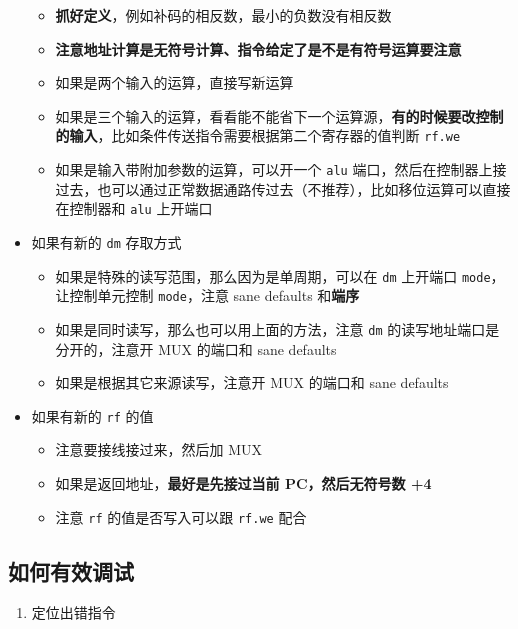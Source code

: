\documentclass[12pt,AutoFakeBold]{article}
\providecommand{\tightlist}{%
  \setlength{\itemsep}{0pt}\setlength{\parskip}{0pt}}
\begin{document}
\begin{itemize}
  \begin{itemize}
  \tightlist
  \item
    \textbf{抓好定义}，例如补码的相反数，最小的负数没有相反数
  \item
    \textbf{注意地址计算是无符号计算、指令给定了是不是有符号运算要注意}
  \item
    如果是两个输入的运算，直接写新运算
  \item
    如果是三个输入的运算，看看能不能省下一个运算源，\textbf{有的时候要改控制的输入}，比如条件传送指令需要根据第二个寄存器的值判断
    \texttt{rf.we}
  \item
    如果是输入带附加参数的运算，可以开一个 \texttt{alu}
    端口，然后在控制器上接过去，也可以通过正常数据通路传过去（不推荐），比如移位运算可以直接在控制器和
    \texttt{alu} 上开端口
  \end{itemize}
\item
  如果有新的 \texttt{dm} 存取方式

  \begin{itemize}
  \tightlist
  \item
    如果是特殊的读写范围，那么因为是单周期，可以在 \texttt{dm} 上开端口
    \texttt{mode}，让控制单元控制 \texttt{mode}，注意 sane defaults
    和\textbf{端序}
  \item
    如果是同时读写，那么也可以用上面的方法，注意 \texttt{dm}
    的读写地址端口是分开的，注意开 MUX 的端口和 sane defaults
  \item
    如果是根据其它来源读写，注意开 MUX 的端口和 sane defaults
  \end{itemize}
\item
  如果有新的 \texttt{rf} 的值

  \begin{itemize}
  \tightlist
  \item
    注意要接线接过来，然后加 MUX
  \item
    如果是返回地址，\textbf{最好是先接过当前 PC，然后无符号数 +4}
  \item
    注意 \texttt{rf} 的值是否写入可以跟 \texttt{rf.we} 配合
  \end{itemize}
\end{itemize}

\hypertarget{ux5982ux4f55ux6709ux6548ux8c03ux8bd5}{%
\subsection{如何有效调试}\label{ux5982ux4f55ux6709ux6548ux8c03ux8bd5}}

\begin{enumerate}
\def\labelenumi{\arabic{enumi}.}
\tightlist
\item
  定位出错指令
\end{enumerate}
\end{document}
